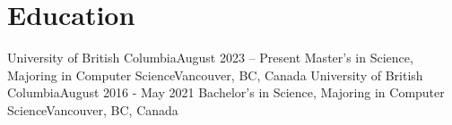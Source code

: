 \section{\textbf{Education}}%
\resumeSubHeadingListStart    
      \resumeSubheading
        {University of British Columbia}{August 2023 – Present}
        {Master's in Science, Majoring in Computer Science}{Vancouver, BC, Canada}
        \resumeItemListStart
        \small{}
        \resumeItemListEnd
    \resumeSubheading
        {University of British Columbia}{August 2016 - May 2021}
        {Bachelor's in Science, Majoring in Computer Science}{Vancouver, BC, Canada}
        \resumeItemListStart
        \small{}
        \resumeItemListEnd

\resumeSubHeadingListEnd